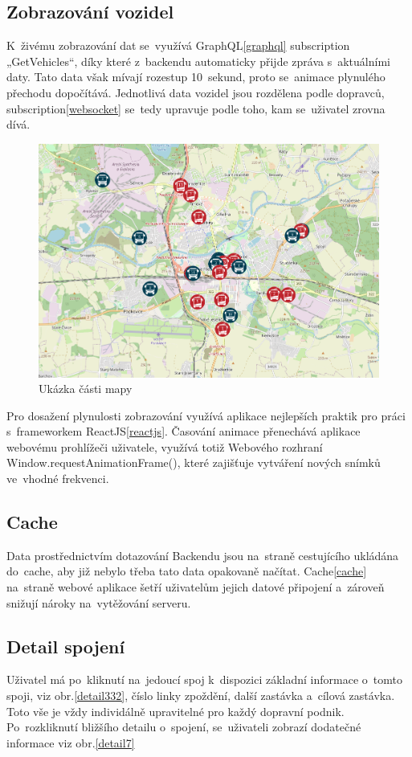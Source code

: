 \subsection{Zobrazování vozidel}
K~živému zobrazování dat se~využívá GraphQL\ref{graphql} subscription „GetVehicles“, díky které z~backendu automaticky přijde zpráva s~aktuálními daty. Tato data však mívají rozestup 10~sekund, proto se~animace plynulého přechodu dopočítává. Jednotlivá data vozidel jsou rozdělena podle dopravců, subscription\ref{websocket} se~tedy upravuje podle toho, kam se~uživatel zrovna dívá.
\begin{figure}[H]
    \centering
    \includegraphics[width=1\textwidth]{images/Screenshot from 2023-03-18 20-15-00.png}
    \caption{Ukázka části mapy}
    \label{mapa}
\end{figure}

Pro dosažení plynulosti zobrazování využívá aplikace nejlepších praktik pro práci s~frameworkem ReactJS\ref{reactjs}. Časování animace přenechává aplikace webovému prohlížeči uživatele, využívá totiž Webového rozhraní Window.requestAnimationFrame()\cite{animationframe}, které zajišťuje vytváření nových snímků ve~vhodné frekvenci.
\subsection{Cache}
Data prostřednictvím dotazování Backendu jsou na~straně cestujícího ukládána do~cache, aby již nebylo třeba tato data opakovaně načítat. Cache\ref{cache} na~straně webové aplikace šetří uživatelům jejich datové připojení a~zároveň snižují nároky na~vytěžování serveru.

\subsection{Detail spojení}
Uživatel má po~kliknutí na~jedoucí spoj k~dispozici základní informace o~tomto spoji, viz obr.\ref{detail332}, číslo linky zpoždění, další zastávka a~cílová zastávka. Toto vše je vždy individálně upravitelné pro každý dopravní podnik. Po~rozkliknutí bližšího detailu o~spojení, se~uživateli zobrazí dodatečné informace viz obr.\ref{detail7}

